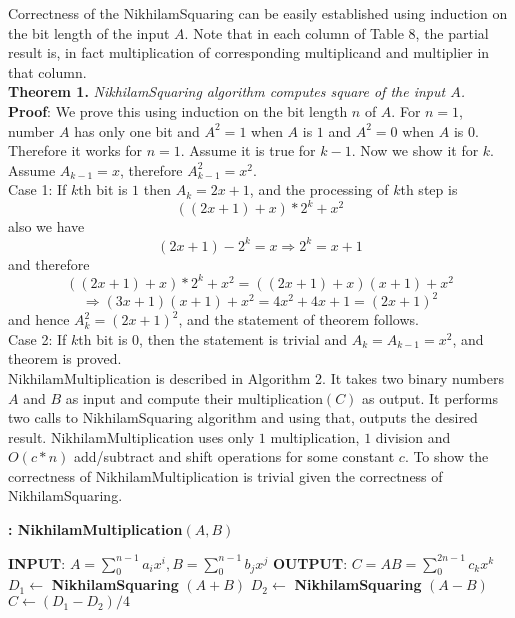 \documentclass[conference]{IEEEtran}
\begin{document}
Correctness of the NikhilamSquaring can be easily established using induction on the bit length of the input $A$. Note that in each column of Table 8, the partial result is, in fact multiplication of corresponding multiplicand and multiplier in that column.\\
 
 
\textbf{Theorem 1.} \textit{NikhilamSquaring algorithm computes square of the input $A$.}\\
 
\textbf{Proof}:  We prove this using induction on the bit length $n$ of $A$. For $n=1$, number $A$ has only one bit and $A^2=1$ when $A$ is $1$ and $A^2=0$ when $A$ is $0$. Therefore it works for $n=1$. Assume it is true for $k-1$. Now we show it for $k$. Assume $A_{k-1} = x$, therefore $A_{k-1}^2=x^2 $. \\
 Case 1: If $k$th bit is $1$ then $A_k=2x+1$, and the processing of $k$th step is $$((2x+1)+x)*2^k + x^2 $$ also we have $$(2x+1)-2^k=x \Rightarrow 2^k = x+1 $$ and therefore
 $$((2x+1)+x)*2^k + x^2 = ((2x+1)+x)(x+1) + x^2$$  $$ \Rightarrow (3x+1)(x+1) +x^2 = 4x^2 + 4x+ 1 = (2x+1)^2 $$
 and hence $A_{k}^2=(2x+1)^2 $, and the statement of theorem follows.\\
 Case 2: If $k$th bit is $0$, then the statement is trivial and $ A_k = A_{k-1} = x^2$, and theorem is proved.\\


\indent NikhilamMultiplication is described in Algorithm 2. It takes two binary numbers $A$ and $B$ as input and compute their multiplication$(C)$ as output. It performs two calls to NikhilamSquaring algorithm and using that, outputs the desired result. NikhilamMultiplication uses only $1$ multiplication, $1$ division and $O(c*n)$ add/subtract and shift operations for some constant $c$. To show the correctness of NikhilamMultiplication is trivial given the correctness of NikhilamSquaring.\\

\begin{algorithm}
\caption{\bf :  NikhilamMultiplication$(A, B)$}
\begin{algorithmic}
\STATE \textbf{INPUT}: $A=\sum_{0}^{n-1} a_i x^i, B=\sum_{0}^{n-1} b_j x^j$
\STATE \textbf{OUTPUT}: $C=AB=\sum_{0}^{2n-1} c_k x^k $
\STATE $D_1 \leftarrow$ \textbf{NikhilamSquaring} $(A+B) $
\STATE $D_2 \leftarrow$ \textbf{NikhilamSquaring} $(A-B) $
\RETURN $C \leftarrow (D_1 - D_2)/4 $
\end{algorithmic}
\end{algorithm}
\end{document}

